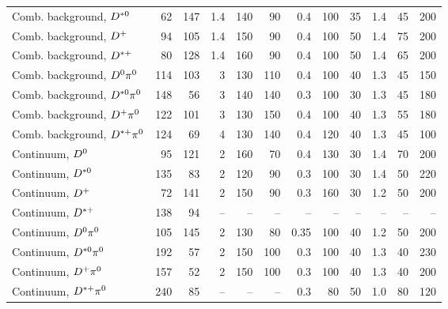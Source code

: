 \documentclass[6pt]{article}
\begin{document}
\begin{tabular}{l r r r r r r r r r r r}
Comb. background, $D^{*0}                    $   &    62    &  147   &  1.4   &  140 &   90  &  0.4    &  100  &  35   &  1.4    & 45  & 200  \\ 
Comb. background, $D^+                        $   &    94    &  105   &  1.4   &  150 &   90  &  0.4    &  100  &  50   &  1.4    & 75  & 200  \\ 
Comb. background, $D^{*+}                    $   &    80    &  128   &  1.4   &  160 &   90  &  0.4    &  100  &  50   &  1.4    & 65  & 200  \\ 
Comb. background, $D^0\pi^0                   $   &    114   &  103   &   3    &  130 &   110 &  0.4    &  100  &  40   &  1.3    & 45  & 150  \\ 
Comb. background, $D^{*0}\pi^0               $   &    148   &  56    &   3    &  140 &   140 &  0.3    &  100  &  30   &  1.3    & 45  & 180  \\ 
Comb. background, $D^+\pi^0                   $   &    122   &  101   &   3    &  130 &   150 &  0.4    &  100  &  40   &  1.3    & 55  & 180  \\ 
Comb. background, $D^{*+}\pi^0               $   &    124   &  69    &   4    &  130 &   140 &  0.4    &  120  &  40   &  1.3    & 45  & 100  \\ 
Continuum, $D^0                               $   &    95    &  121   &  2     &  160 &   70  &  0.4    &  130  &  30   &  1.4    & 70  & 200  \\ 
Continuum, $D^{*0}                           $   &    135   &  83    &  2     &  120 &   90  &  0.3    &  100  &  30   &  1.4    & 50  & 220  \\ 
Continuum, $D^+                               $   &    72    &  141   &  2     &  150 &   90  &  0.3    &  160  &  30   &  1.2    & 50  & 200  \\ 
Continuum, $D^{*+}                           $   &    138   &  94    &  --    &  --  &  --   &  --     &  --   &  --   &  --     & --  & --   \\ 
Continuum, $D^0\pi^0                          $   &    105   &  145   &  2     &  130 &   80  &  0.35   &  100  &  40   &  1.2    & 50  & 200  \\ 
Continuum, $D^{*0}\pi^0                      $   &    192   &  57    &   2    &  150 &   100 &  0.3    &  100  &  40   &  1.3    & 40  & 230  \\ 
Continuum, $D^+\pi^0                          $   &    157   &  52    &   2    &  150 &   100 &  0.3    &  100  &  40   &  1.3    & 40  & 200  \\ 
Continuum, $D^{*+}\pi^0                      $   &    240   &  85    &  --    &  --  &  --   &  0.3    &  80   & 50    &  1.0    & 80  & 120  \\  \hline \hline  
							   
\end{tabular}
\end{document}
